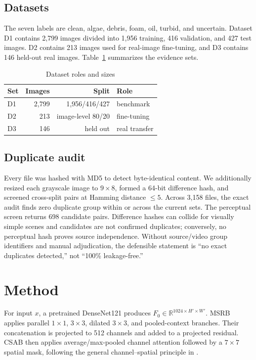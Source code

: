 \documentclass[journal]{IEEEtran}
\begin{document}
\subsection{Datasets}
The seven labels are clean, algae, debris, foam, oil, turbid, and uncertain. Dataset D1 contains 2,799 images divided into 1,956 training, 416 validation, and 427 test images. D2 contains 213 images used for real-image fine-tuning, and D3 contains 146 held-out real images. Table~\ref{tab:data} summarizes the evidence sets.
\begin{table}[t]
\caption{Dataset roles and sizes}\label{tab:data}\centering
\begin{tabular}{lrrl}\toprule
Set & Images & Split & Role\\\midrule
D1 & 2,799 & 1,956/416/427 & benchmark\\
D2 & 213 & image-level 80/20 & fine-tuning\\
D3 & 146 & held out & real transfer\\\bottomrule
\end{tabular}
\end{table}

\subsection{Duplicate audit}
Every file was hashed with MD5 to detect byte-identical content. We additionally resized each grayscale image to $9\times8$, formed a 64-bit difference hash, and screened cross-split pairs at Hamming distance $\leq5$. Across 3,158 files, the exact audit finds zero duplicate group within or across the current sets. The perceptual screen returns 698 candidate pairs. Difference hashes can collide for visually simple scenes and candidates are not confirmed duplicates; conversely, no perceptual hash proves source independence. Without source/video group identifiers and manual adjudication, the defensible statement is ``no exact duplicates detected,'' not ``100\% leakage-free.''

\section{Method}
For input $x$, a pretrained DenseNet121 produces $F_0\in\mathbb{R}^{1024\times H'\times W'}$. MSRB applies parallel $1\times1$, $3\times3$, dilated $3\times3$, and pooled-context branches. Their concatenation is projected to 512 channels and added to a projected residual. CSAB then applies average/max-pooled channel attention followed by a $7\times7$ spatial mask, following the general channel--spatial principle in \cite{cbam}.
\end{document}

